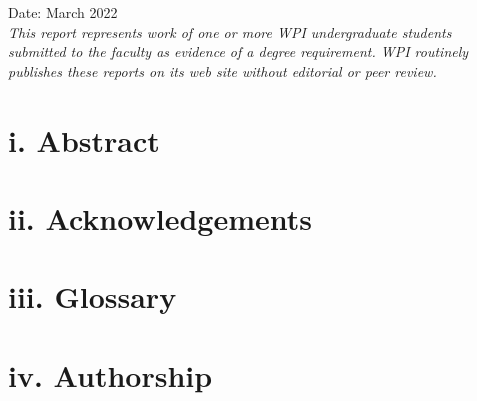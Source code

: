 \documentclass[oneside, 12pt]{book}
\begin{document}
\begin{titlepage}
    \vfill
  Date: March 2022\\
  \vspace{0.5cm}
  \textit{This report represents work of one or more WPI undergraduate students submitted to the faculty as evidence of a degree requirement. WPI routinely publishes these reports on its web site without editorial or peer review.}
\end{titlepage}

\frontmatter
    \tableofcontents
    \chapter{i. Abstract}
        
    \chapter{ii. Acknowledgements}
        
    \chapter{iii. Glossary}
        
\chapter{iv. Authorship}
\end{document}
